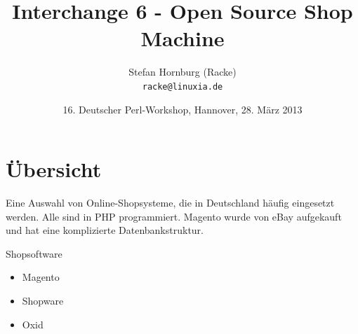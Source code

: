 \usepackage[utf8]{inputenc}
\usepackage[T1]{fontenc}
\usepackage{mathptmx}
\usepackage[scaled=.90]{helvet}
\usepackage{courier}
\usepackage{caption}
\captionsetup{labelformat=empty,labelsep=none}
\usepackage{verbatim}
\usepackage{hyperref}
\usepackage{listings}
\usepackage{ulem}
\lstset{language=Perl,basicstyle=\normalsize,tabsize=3,showstringspaces=false}

\title{Interchange 6 - Open Source Shop Machine}
\author[racke]{Stefan Hornburg (Racke)\\ \texttt{racke@linuxia.de}}
\date{16. Deutscher Perl-Workshop, Hannover, 28. März 2013}


\maketitle{}

\begin{frame}
  \titlepage
\end{frame}

\tableofcontents

\section{Übersicht}

Eine Auswahl von Online-Shopsysteme, die in Deutschland häufig eingesetzt
werden. Alle sind in PHP programmiert. Magento wurde von eBay aufgekauft
und hat eine komplizierte Datenbankstruktur.
 
\begin{frame}{Shopsoftware}
  \begin{itemize}
  \item Magento
  \item Shopware
  \item Oxid
  \end{itemize}
\end{frame}

